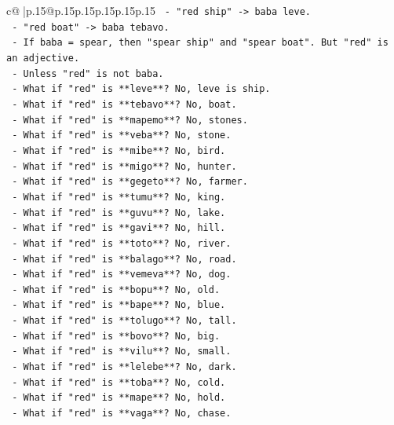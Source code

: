 \documentclass{article}
\begin{document}
{\begin{supertabular}{c@{$\;$}|p{.15\linewidth}@{}p{.15\linewidth}p{.15\linewidth}p{.15\linewidth}p{.15\linewidth}p{.15\linewidth}}
{{{\texttt{      {-} "red ship" {-}> baba leve.} \\
\texttt{      {-} "red boat" {-}> baba tebavo.} \\
\texttt{      {-} If baba = spear, then "spear ship" and "spear boat". But "red" is an adjective.} \\
\texttt{      {-} Unless "red" is not baba.} \\
\texttt{      {-} What if "red" is **leve**? No, leve is ship.} \\
\texttt{      {-} What if "red" is **tebavo**? No, boat.} \\
\texttt{      {-} What if "red" is **mapemo**? No, stones.} \\
\texttt{      {-} What if "red" is **veba**? No, stone.} \\
\texttt{      {-} What if "red" is **mibe**? No, bird.} \\
\texttt{      {-} What if "red" is **migo**? No, hunter.} \\
\texttt{      {-} What if "red" is **gegeto**? No, farmer.} \\
\texttt{      {-} What if "red" is **tumu**? No, king.} \\
\texttt{      {-} What if "red" is **guvu**? No, lake.} \\
\texttt{      {-} What if "red" is **gavi**? No, hill.} \\
\texttt{      {-} What if "red" is **toto**? No, river.} \\
\texttt{      {-} What if "red" is **balago**? No, road.} \\
\texttt{      {-} What if "red" is **vemeva**? No, dog.} \\
\texttt{      {-} What if "red" is **bopu**? No, old.} \\
\texttt{      {-} What if "red" is **bape**? No, blue.} \\
\texttt{      {-} What if "red" is **tolugo**? No, tall.} \\
\texttt{      {-} What if "red" is **bovo**? No, big.} \\
\texttt{      {-} What if "red" is **vilu**? No, small.} \\
\texttt{      {-} What if "red" is **lelebe**? No, dark.} \\
\texttt{      {-} What if "red" is **toba**? No, cold.} \\
\texttt{      {-} What if "red" is **mape**? No, hold.} \\
\texttt{      {-} What if "red" is **vaga**? No, chase.} \\
}}}
\end{supertabular}}
\end{document}
